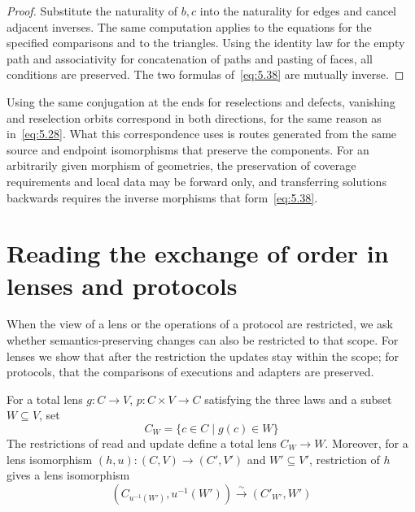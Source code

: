 \begin{proof}

Substitute the naturality of $b,c$ into the naturality for edges and cancel adjacent
inverses. The same computation applies to the equations for the specified comparisons and
to the triangles. Using the identity law for the empty path and associativity for
concatenation of paths and pasting of faces, all conditions are preserved. The two formulas
of~\eqref{eq:5.38} are mutually inverse.

\end{proof}

Using the same conjugation at the ends for reselections and defects, vanishing and
reselection orbits correspond in both directions, for the same reason as
in~\eqref{eq:5.28}. What this correspondence uses is routes generated from the same source
and endpoint isomorphisms that preserve the components. For an arbitrarily given morphism
of geometries, the preservation of coverage requirements and local data may be forward
only, and transferring solutions backwards requires the inverse morphisms that
form~\eqref{eq:5.38}.

\section{Reading the exchange of order in lenses and protocols}\label{sec:5.9}

When the view of a lens or the operations of a protocol are restricted, we ask whether
semantics-preserving changes can also be restricted to that scope. For lenses we show that
after the restriction the updates stay within the scope; for protocols, that the
comparisons of executions and adapters are preserved.

\begin{proposition}\label{prop:5.34}

For a total lens $g:C\to V$, $p:C\times V\to C$ satisfying the three laws and a subset
$W\subseteq V$, set
\begin{equation*}
C_W=\{c\in C\mid g(c)\in W\}
\tag{5.39}\label{eq:5.39}
\end{equation*}
The restrictions of read and update define a total lens $C_W\to W$.
Moreover, for a lens isomorphism $(h,u):(C,V)\to(C',V')$ and $W'\subseteq V'$,
restriction of $h$ gives a lens isomorphism
\begin{equation*}
(C_{u^{-1}(W')},u^{-1}(W'))
\xrightarrow{\sim}(C'_{W'},W')
\tag{5.40}\label{eq:5.40}
\end{equation*}


\end{proposition}

